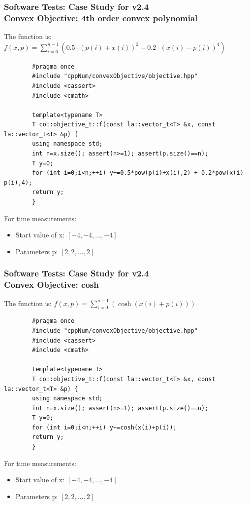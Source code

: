 \documentclass[ucs,10pt]{beamer}
\begin{document}
\begin{frame}[fragile]
\frametitle{Software Tests: Case Study for v2.4 \\
	\small \color{rwth-blue} Convex Objective: 4th order convex polynomial}
	The function is:
	$f(x, p) = \sum_{i=0}^{n-1} (0.5 \cdot (p(i) + x(i))^2 + 0.2 \cdot (x(i) - p(i))^4)$
	\begin{lstlisting}
		#pragma once
		#include "cppNum/convexObjective/objective.hpp"
		#include <cassert>
		#include <cmath>
		
		template<typename T> 
		T co::objective_t::f(const la::vector_t<T> &x, const la::vector_t<T> &p) { 
		using namespace std;
		int n=x.size(); assert(n>=1); assert(p.size()==n);
		T y=0;
		for (int i=0;i<n;++i) y+=0.5*pow(p(i)+x(i),2) + 0.2*pow(x(i)-p(i),4);
		return y;
		}
	\end{lstlisting}
	For time measurements:
	\begin{itemize}
		\item Start value of x: $[-4, -4, ..., -4]$
		\item Parameters p: $[2, 2, ..., 2]$
	\end{itemize}
\end{frame}
	
\begin{frame}[fragile]
\frametitle{Software Tests: Case Study for v2.4 \\
	\small \color{rwth-blue} Convex Objective: cosh}
	The function is:
	$f(x, p) = \sum_{i=0}^{n-1} (\cosh(x(i) + p(i)))$
	\begin{lstlisting}
		#pragma once
		#include "cppNum/convexObjective/objective.hpp"
		#include <cassert>
		#include <cmath>
		
		template<typename T> 
		T co::objective_t::f(const la::vector_t<T> &x, const la::vector_t<T> &p) { 
		using namespace std;
		int n=x.size(); assert(n>=1); assert(p.size()==n);
		T y=0;
		for (int i=0;i<n;++i) y+=cosh(x(i)+p(i));
		return y;
		}
	\end{lstlisting}
        For time measurements:
        \begin{itemize}
                \item Start value of x: $[-4, -4, ..., -4]$
                \item Parameters p: $[2, 2, ..., 2]$
        \end{itemize}
\end{frame}
	
\end{document}
